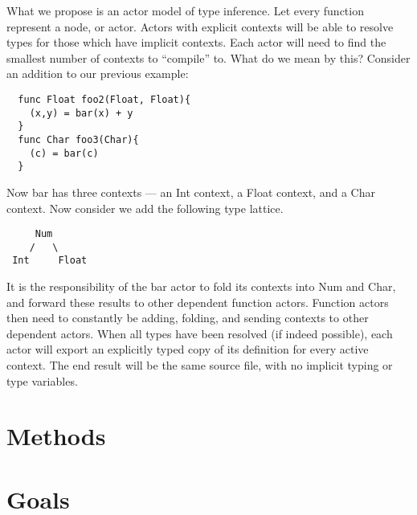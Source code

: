 \documentclass{article}[9pt]
\begin{document}
What we propose is an actor model of type inference. Let every
function represent a node, or actor. Actors with explicit contexts
will be able to resolve types for those which have implicit
contexts. Each actor will need to find the smallest number of contexts
to ``compile'' to. What do we mean by this? Consider an addition to our
previous example: 
\begin{lstlisting}
  func Float foo2(Float, Float){
    (x,y) = bar(x) + y
  }
  func Char foo3(Char){
    (c) = bar(c)
  }
\end{lstlisting}
Now bar has three contexts --- an Int context, a Float context, and a
Char context. Now consider we add the following type lattice. 
\begin{verbatim}
     Num
    /   \
 Int     Float
\end{verbatim}
It is the responsibility of the bar actor to fold its contexts into
Num and Char, and forward these results to other dependent function
actors. Function actors then need to constantly be adding, folding,
and sending contexts to other dependent actors. 
When all types have been resolved (if indeed possible), each actor
will export an explicitly typed copy of its definition for every
active context. The end result will be the same source file, with no
implicit typing or type variables. 

\section*{Methods}
\section*{Goals}
\end{document}
